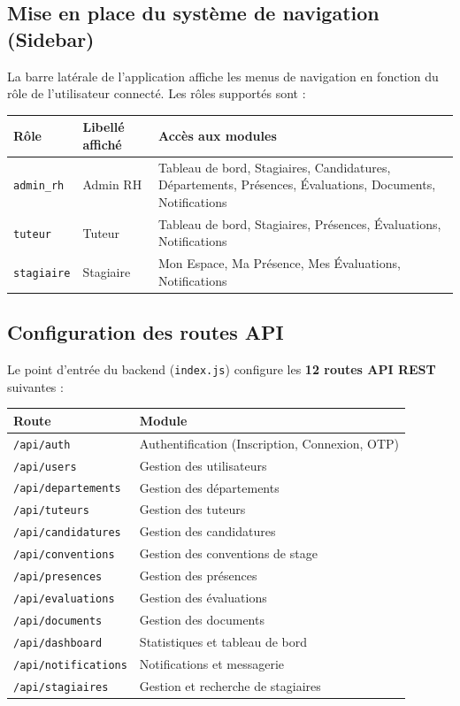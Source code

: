 \subsection{Mise en place du système de navigation (Sidebar)}
La barre latérale de l'application affiche les menus de navigation en fonction du rôle de l'utilisateur connecté. Les rôles supportés sont :

\begin{center}
\begin{tabular}{|l|l|p{6cm}|}
\hline
\textbf{Rôle} & \textbf{Libellé affiché} & \textbf{Accès aux modules} \\ \hline
\texttt{admin\_rh} & Admin RH & Tableau de bord, Stagiaires, Candidatures, Départements, Présences, Évaluations, Documents, Notifications \\ \hline
\texttt{tuteur} & Tuteur & Tableau de bord, Stagiaires, Présences, Évaluations, Notifications \\ \hline
\texttt{stagiaire} & Stagiaire & Mon Espace, Ma Présence, Mes Évaluations, Notifications \\ \hline
\end{tabular}
\end{center}

\subsection{Configuration des routes API}
Le point d'entrée du backend (\texttt{index.js}) configure les \textbf{12 routes API REST} suivantes :

\begin{center}
\begin{tabular}{|l|l|}
\hline
\textbf{Route} & \textbf{Module} \\ \hline
\texttt{/api/auth} & Authentification (Inscription, Connexion, OTP) \\ \hline
\texttt{/api/users} & Gestion des utilisateurs \\ \hline
\texttt{/api/departements} & Gestion des départements \\ \hline
\texttt{/api/tuteurs} & Gestion des tuteurs \\ \hline
\texttt{/api/candidatures} & Gestion des candidatures \\ \hline
\texttt{/api/conventions} & Gestion des conventions de stage \\ \hline
\texttt{/api/presences} & Gestion des présences \\ \hline
\texttt{/api/evaluations} & Gestion des évaluations \\ \hline
\texttt{/api/documents} & Gestion des documents \\ \hline
\texttt{/api/dashboard} & Statistiques et tableau de bord \\ \hline
\texttt{/api/notifications} & Notifications et messagerie \\ \hline
\texttt{/api/stagiaires} & Gestion et recherche de stagiaires \\ \hline
\end{tabular}
\end{center}

